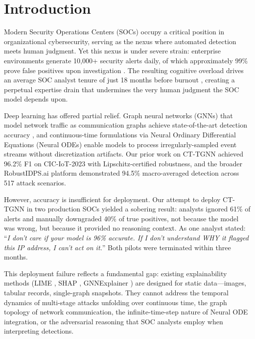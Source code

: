 \documentclass[preprint,review,12pt]{elsarticle}
\begin{document}
\section{Introduction}
\label{sec:introduction}

Modern Security Operations Centers (SOCs) occupy a critical position in organizational cybersecurity, serving as the nexus where automated detection meets human judgment. Yet this nexus is under severe strain: enterprise environments generate 10{,}000+ security alerts daily, of which approximately 99\% prove false positives upon investigation \cite{cortex2025}. The resulting cognitive overload drives an average SOC analyst tenure of just 18 months before burnout \cite{acm_survey_2025}, creating a perpetual expertise drain that undermines the very human judgment the SOC model depends upon.

Deep learning has offered partial relief. Graph neural networks (GNNs) that model network traffic as communication graphs achieve state-of-the-art detection accuracy \cite{gnn_ids_2024, te_gsage_2025}, and continuous-time formulations via Neural Ordinary Differential Equations (Neural ODEs) \cite{chen_neural_ode_2018} enable models to process irregularly-sampled event streams without discretization artifacts. Our prior work on CT-TGNN \cite{anaedevha_ct_tgnn} achieved 96.2\% F1 on CIC-IoT-2023 with Lipschitz-certified robustness, and the broader RobustIDPS.ai platform \cite{anaedevha_robustidps} demonstrated 94.5\% macro-averaged detection across 517 attack scenarios.

However, accuracy is insufficient for deployment. Our attempt to deploy CT-TGNN in two production SOCs yielded a sobering result: analysts ignored 61\% of alerts and manually downgraded 40\% of true positives, not because the model was wrong, but because it provided no reasoning context. As one analyst stated: ``\textit{I don't care if your model is 96\% accurate. If I don't understand WHY it flagged this IP address, I can't act on it.}'' Both pilots were terminated within three months.

This deployment failure reflects a fundamental gap: existing explainability methods (LIME \cite{ribeiro_lime_2016}, SHAP \cite{lundberg_shap_2017}, GNNExplainer \cite{ying_gnnexplainer_2019}) are designed for static data---images, tabular records, single-graph snapshots. They cannot address the temporal dynamics of multi-stage attacks unfolding over continuous time, the graph topology of network communication, the infinite-time-step nature of Neural ODE integration, or the adversarial reasoning that SOC analysts employ when interpreting detections.
\end{document}

